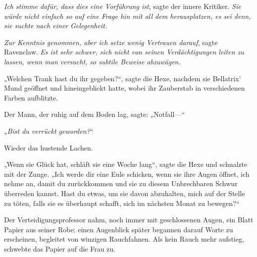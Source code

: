 \emph{Ich stimme dafür, dass dies eine Vorführung ist}, sagte der innere Kritiker. \emph{Sie würde nicht einfach so auf eine Frage hin mit all dem herausplatzen, es sei denn, sie suchte nach einer Gelegenheit.}

\emph{Zur Kenntnis genommen, aber ich setze wenig Vertrauen darauf}, sagte Ravenclaw. \emph{Es ist sehr schwer, sich nicht von seinen Verdächtigungen leiten zu lassen, wenn man versucht, so subtile Beweise abzuwägen.}

„Welchen Trank hast du ihr gegeben?“, sagte die Hexe, nachdem sie Bellatrix’ Mund geöffnet und hineingeblickt hatte, wobei ihr Zauberstab in verschiedenen Farben aufblitzte.

Der Mann, der ruhig auf dem Boden lag, sagte: „Notfall—“

„\emph{Bist du verrückt geworden?}“

Wieder das hustende Lachen.

„Wenn sie Glück hat, schläft sie eine Woche lang“, sagte die Hexe und schnalzte mit der Zunge. „Ich werde dir eine Eule schicken, wenn sie ihre Augen öffnet, ich nehme an, damit du zurückkommen und sie zu diesem Unbrechbaren Schwur überreden kannst. Hast du etwas, um sie davon abzuhalten, mich auf der Stelle zu töten, falls sie es überhaupt schafft, sich im nächsten Monat zu bewegen?“

Der Verteidigungsprofessor nahm, noch immer mit geschlossenen Augen, ein Blatt Papier aus seiner Robe; einen Augenblick später begannen darauf Worte zu erscheinen, begleitet von winzigen Rauchfahnen. Als kein Rauch mehr aufstieg, schwebte das Papier auf die Frau zu.

